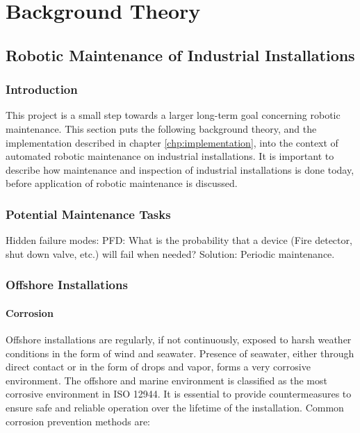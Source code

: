 \chapter{Background Theory}
\label{chp:theory} 


\section{Robotic Maintenance of Industrial Installations}

\subsection{Introduction}

This project is a small step towards a larger long-term goal concerning robotic maintenance. This section puts the following background theory, and the implementation described in chapter \ref{chp:implementation}, into the context of automated robotic maintenance on industrial installations. It is important to describe how maintenance and inspection of industrial installations is done today, before application of robotic maintenance is discussed.  

\subsection{Potential Maintenance Tasks}

Hidden failure modes: PFD: What is the probability that a device (Fire detector, shut down valve, etc.) will fail when needed? 
Solution: Periodic maintenance.

\subsection{Offshore Installations}

\subsubsection{Corrosion}

Offshore installations are regularly, if not continuously, exposed to harsh weather conditions in the form of wind and seawater. Presence of seawater, either through direct contact or in the form of drops and vapor, forms a very corrosive environment. The offshore and marine environment is classified as the most corrosive environment in ISO 12944\cite{ElReedy2012383}. It is essential to provide countermeasures to ensure safe and reliable operation over the lifetime of the installation. Common corrosion prevention methods are\cite{ElReedy2012383}:

